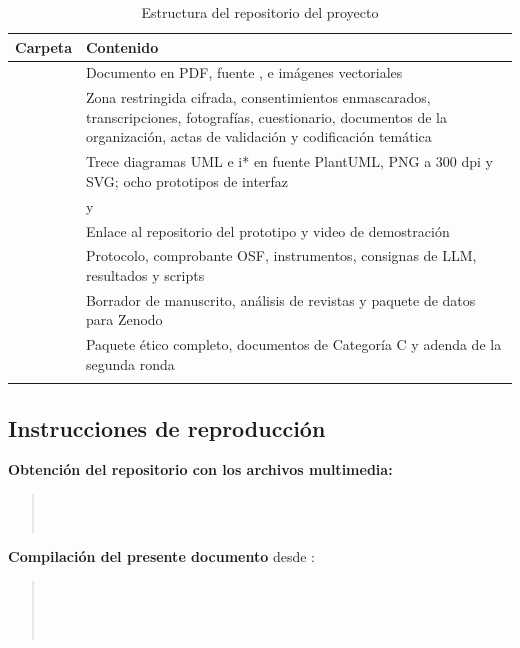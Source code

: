 \begin{longtable}{|L{4.6cm}|L{10.8cm}|}
\hline
{}\textbf{Carpeta} & \textbf{Contenido} \\
\hline
\endhead
{} & Documento en PDF, fuente ,  e imágenes vectoriales \\ \hline
{} & Zona restringida cifrada, consentimientos enmascarados, transcripciones, fotografías, cuestionario, documentos de la organización, actas de validación y codificación temática \\ \hline
{} & Trece diagramas UML e i* en fuente PlantUML, PNG a 300 dpi y SVG; ocho prototipos de interfaz \\ \hline
{} &  y  \\ \hline
{} & Enlace al repositorio del prototipo y video de demostración \\ \hline
{} & Protocolo, comprobante OSF, instrumentos, consignas de LLM, resultados y scripts \\ \hline
{} & Borrador de manuscrito, análisis de revistas y paquete de datos para Zenodo \\ \hline
{} & Paquete ético completo, documentos de Categoría C y adenda de la segunda ronda \\ \hline
\caption{Estructura del repositorio del proyecto}
\end{longtable}

\subsection{Instrucciones de reproducción}

\textbf{Obtención del repositorio con los archivos multimedia:}

\begin{quote}
\allowbreak{}\\
\\
\end{quote}

\noindent
\textbf{Compilación del presente documento} desde :

\begin{quote}
\\
\\
\\
\end{quote}

